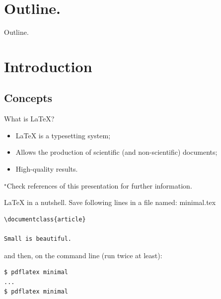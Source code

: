 



\section*{Outline.}
\begin{frame}{Outline.}
\tableofcontents
\end{frame}


\section{Introduction}

\subsection{Concepts}
\begin{frame}{What is \LaTeX{}?}
\begin{itemize}
\item \LaTeX{} is a typesetting system;
\item Allows the production of scientific (and non-scientific) documents;
\item High-quality results.
\end{itemize}
\small $\phantom{}^\star$Check references of this presentation for further information.
\end{frame}

\begin{frame}[fragile]{\LaTeX{} in a nutshell.}
Save following lines in a file named: minimal.tex
\begin{verbatim}
\documentclass{article}

Small is beautiful.

\end{verbatim}
and then, on the command line (run twice at least):
\begin{verbatim}
$ pdflatex minimal
...
$ pdflatex minimal
\end{verbatim}
\end{frame}

